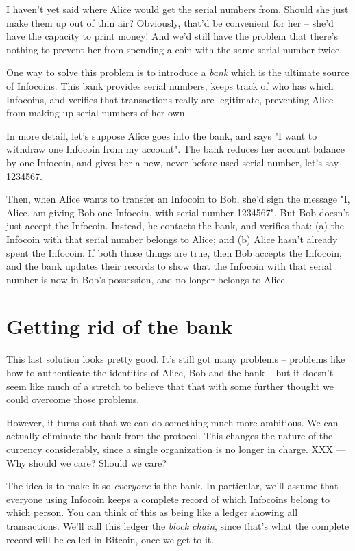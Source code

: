 \documentclass[12pt]{book}
\newcounter{problem}[chapter]
\begin{document}
I haven't yet said where Alice would get the serial numbers from.
Should she just make them up out of thin air?  Obviously, that'd be
convenient for her -- she'd have the capacity to print money!  And
we'd still have the problem that there's nothing to prevent her from
spending a coin with the same serial number twice.

One way to solve this problem is to introduce a \emph{bank} which is
the ultimate source of Infocoins.  This bank provides serial numbers,
keeps track of who has which Infocoins, and verifies that transactions
really are legitimate, preventing Alice from making up serial numbers
of her own.

In more detail, let's suppose Alice goes into the bank, and says "I
want to withdraw one Infocoin from my account".  The bank reduces her
account balance by one Infocoin, and gives her a new, never-before
used serial number, let's say 1234567.

Then, when Alice wants to transfer an Infocoin to Bob, she'd sign the
message "I, Alice, am giving Bob one Infocoin, with serial number
1234567".  But Bob doesn't just accept the Infocoin.  Instead, he
contacts the bank, and verifies that: (a) the Infocoin with that
serial number belongs to Alice; and (b) Alice hasn't already spent the
Infocoin.  If both those things are true, then Bob accepts the
Infocoin, and the bank updates their records to show that the Infocoin
with that serial number is now in Bob's possession, and no longer
belongs to Alice.

\section{Getting rid of the bank}

This last solution looks pretty good.  It's still got many problems --
problems like how to authenticate the identities of Alice, Bob and the
bank -- but it doesn't seem like much of a stretch to believe that
that with some further thought we could overcome those problems.

However, it turns out that we can do something much more ambitious.
We can actually eliminate the bank from the protocol.  This changes
the nature of the currency considerably, since a single organization
is no longer in charge.  XXX --- Why should we care?  Should we care?

The idea is to make it so \emph{everyone} is the bank.  In particular,
we'll assume that everyone using Infocoin keeps a complete record of
which Infocoins belong to which person.  You can think of this as
being like a ledger showing all transactions.  We'll call this ledger
the \emph{block chain}, since that's what the complete record will be
called in Bitcoin, once we get to it.
\end{document}
